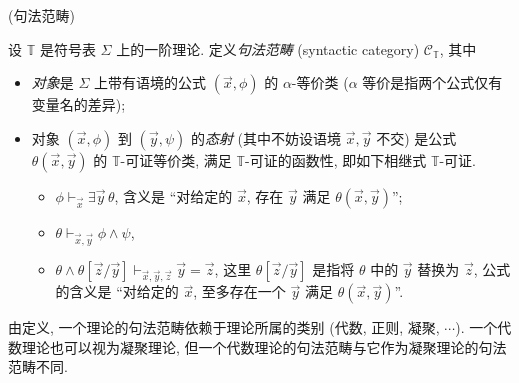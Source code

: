 



\begin{definition}
	{(句法范畴)}
	
	设 $\mathbb T$ 是符号表 $\Sigma$ 上的一阶理论. 定义\emph{句法范畴} (syntactic category) $\mathcal C_{\mathbb T}$, 其中
	\begin{itemize}
		\item \emph{对象}是 $\Sigma$ 上带有语境的公式 $(\vec x , \phi)$ 的 $\alpha$-等价类 ($\alpha$ 等价是指两个公式仅有变量名的差异);
		\item 对象 $(\vec x , \phi)$ 到 $(\vec y , \psi)$ 的\emph{态射} (其中不妨设语境 $\vec x , \vec y$ 不交) 是公式 $\theta(\vec x,\vec y)$ 的 $\mathbb T$-可证等价类, 满足 $\mathbb T$-可证的函数性, 即如下相继式 $\mathbb T$-可证.
		\begin{itemize}
			\item $\phi\vdash_{\vec x} \exists \vec y \,\theta$, 含义是 ``对给定的 $\vec x$, 存在 $\vec y$ 满足 $\theta(\vec x,\vec y)$'';
			\item $\theta\vdash_{\vec x,\vec y} \phi \wedge \psi$,
			\item $\theta \wedge \theta[\vec z/\vec y] \vdash_{\vec x,\vec y,\vec z} \vec y = \vec z$, 这里 $\theta[\vec z / \vec y]$ 是指将 $\theta$ 中的 $\vec y$ 替换为 $\vec z$, 公式的含义是 ``对给定的 $\vec x$, 至多存在一个 $\vec y$ 满足 $\theta(\vec x,\vec y)$''.
		\end{itemize}
	\end{itemize}
\end{definition}

\begin{remark}
	{}
	由定义, 一个理论的句法范畴依赖于理论所属的类别 (代数, 正则, 凝聚, $\cdots$). 一个代数理论也可以视为凝聚理论, 但一个代数理论的句法范畴与它作为凝聚理论的句法范畴不同.
\end{remark}

